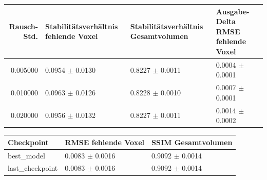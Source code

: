 \begin{tabular}{rlll}
\toprule
Rausch-Std. & Stabilitätsverhältnis fehlende Voxel & Stabilitätsverhältnis Gesamtvolumen & Ausgabe-Delta RMSE fehlende Voxel \\
\midrule
0.005000 & 0.0954 $\pm$ 0.0130 & 0.8227 $\pm$ 0.0011 & 0.0004 $\pm$ 0.0001 \\
0.010000 & 0.0963 $\pm$ 0.0126 & 0.8228 $\pm$ 0.0010 & 0.0007 $\pm$ 0.0001 \\
0.020000 & 0.0956 $\pm$ 0.0132 & 0.8227 $\pm$ 0.0011 & 0.0014 $\pm$ 0.0002 \\
\bottomrule
\end{tabular}


\begin{tabular}{lll}
\toprule
Checkpoint & RMSE fehlende Voxel & SSIM Gesamtvolumen \\
\midrule
best_model & 0.0083 $\pm$ 0.0016 & 0.9092 $\pm$ 0.0014 \\
last_checkpoint & 0.0083 $\pm$ 0.0016 & 0.9092 $\pm$ 0.0014 \\
\bottomrule
\end{tabular}

